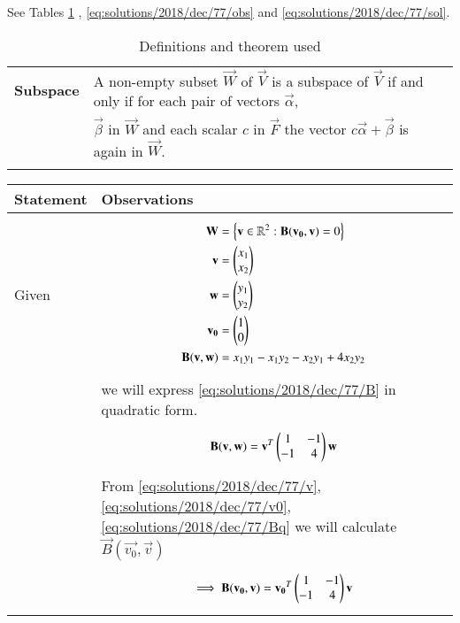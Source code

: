 See Tables \ref{eq:solutions/2018/dec/77/deftab}
, \ref{eq:solutions/2018/dec/77/obs}
and \ref{eq:solutions/2018/dec/77/sol}.

\onecolumn
\begin{longtable}{|l|l|}
\hline
\endhead
\textbf{Subspace}&A non-empty subset $\vec{W}$ of $\vec{V}$ is a subspace of $\vec{V}$ if and only if for each pair of vectors $\vec{\alpha}$,\\& $\vec{\beta}$ in $\vec{W}$ and each scalar $c$ in $\vec{F}$ the vector $c\vec{\alpha}+\vec{\beta}$ is again in $\vec{W}$.\\
\hline
\caption{Definitions and theorem used}
\label{eq:solutions/2018/dec/77/deftab}
\end{longtable}
\begin{longtable}{|l|l|}
\hline
\endhead
\textbf{Statement}&\textbf{Observations}\\
\hline
Given&\parbox{15cm}{\begin{align}
    \mathbf{W}&=\left\{\mathbf{v}\in\mathbb{R}^2:\mathbf{B}(\mathbf{v_0},\mathbf{v})=0\right\}\label{eq:solutions/2018/dec/77/W}\\
    \mathbf{v}&=\begin{pmatrix}x_1\\x_2\end{pmatrix}\label{eq:solutions/2018/dec/77/v}\\
    \mathbf{w}&=\begin{pmatrix}y_1\\y_2\end{pmatrix}\label{eq:solutions/2018/dec/77/w}\\
    \mathbf{v_0}&=\begin{pmatrix}1\\0\end{pmatrix}\label{eq:solutions/2018/dec/77/v0}\\
    \mathbf{B}(\mathbf{v},\mathbf{w})&=x_1y_1-x_1y_2-x_2y_1+4x_2y_2\label{eq:solutions/2018/dec/77/B}
\end{align}}\\&we will express \eqref{eq:solutions/2018/dec/77/B} in quadratic form.\\&\parbox{15cm}{\begin{align}
    \mathbf{B}(\mathbf{v},\mathbf{w})=\mathbf{v}^T\begin{pmatrix}1&-1\\-1&4\end{pmatrix}\mathbf{w}\label{eq:solutions/2018/dec/77/Bq}
\end{align}}\\&From \eqref{eq:solutions/2018/dec/77/v}, \eqref{eq:solutions/2018/dec/77/v0}, \eqref{eq:solutions/2018/dec/77/Bq} we will calculate $\vec{B}(\vec{v_0},\vec{v})$\\&\parbox{15cm}{\begin{align}
    \implies\vec{B}(\vec{v_0},\vec{v})&=\vec{v_0}^T\myvec{1&-1\\-1&4}\vec{v}\\

\end{align}}
\end{longtable}
